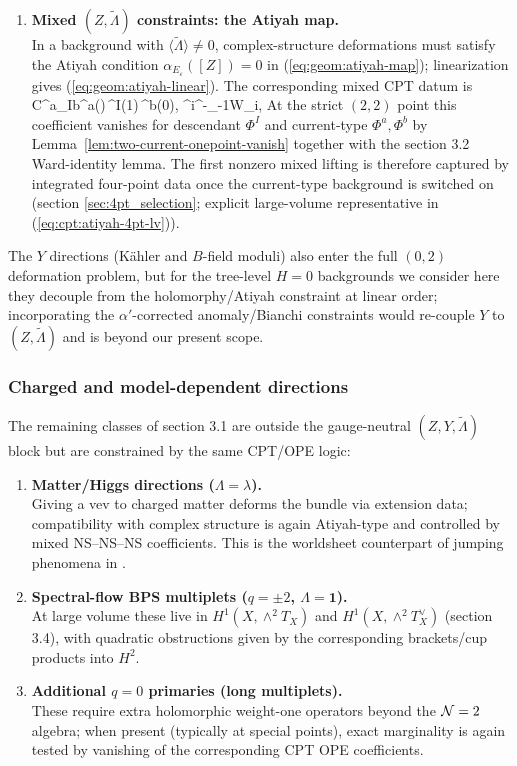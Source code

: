 \documentclass[12pt]{article}
\newcommand{\wt}[1]{\widetilde{#1}}
\begin{document}
\begin{enumerate}
\item {\bf Mixed $(Z,\widetilde\Lambda)$ constraints: the Atiyah map.}\\
In a background with $\langle\widetilde\Lambda\rangle\neq 0$, complex-structure deformations must satisfy the Atiyah condition $\alpha_{E_\varepsilon}([Z])=0$ in (\ref{eq:geom:atiyah-map}); linearization gives (\ref{eq:geom:atiyah-linear}). The corresponding mixed CPT datum is
\ie\label{eq:cpt:atiyah-3pt}
C^{a}{}_{Ib}\;\propto\;\left\langle \Phi^{a}(\infty)\,\Phi^{I}(1)\,\Phi^{b}(0)\right\rangle,
\qquad
\Phi^{i}\equiv \wt G^-_{-{1}}{\cal W}_i,
\fe
At the strict $(2,2)$ point this coefficient vanishes for descendant $\Phi^{I}$ and current-type $\Phi^{a},\Phi^{b}$ by Lemma~\ref{lem:two-current-onepoint-vanish} together with the section 3.2 Ward-identity lemma. The first nonzero mixed lifting is therefore captured by integrated four-point data once the current-type background is switched on (section \ref{sec:4pt_selection}; explicit large-volume representative in (\ref{eq:cpt:atiyah-4pt-lv})).
\end{enumerate}

The $Y$ directions (K\"ahler and $B$-field moduli) also enter the full $(0,2)$ deformation problem, but for the tree-level $H=0$ backgrounds we consider here they decouple from the holomorphy/Atiyah constraint at linear order; incorporating the $\alpha'$-corrected anomaly/Bianchi constraints would re-couple $Y$ to $(Z,\widetilde\Lambda)$ and is beyond our present scope.

\subsubsection*{Charged and model-dependent directions}

The remaining classes of section 3.1 are outside the gauge-neutral $(Z,Y,\widetilde\Lambda)$ block but are constrained by the same CPT/OPE logic:
\begin{enumerate}
\item {\bf Matter/Higgs directions ($\Lambda=\lambda$).}\\
Giving a vev to charged matter deforms the bundle via extension data; compatibility with complex structure is again Atiyah-type and controlled by mixed NS--NS--NS coefficients. This is the worldsheet counterpart of jumping phenomena in \cite{Anderson:2010mh,Anderson:2011ty}.
\item {\bf Spectral-flow BPS multiplets ($q=\pm 2$, $\Lambda=\mathbf{1}$).}\\
At large volume these live in $H^1(X,\wedge^2 T_X)$ and $H^1(X,\wedge^2 T_X^\vee)$ (section 3.4), with quadratic obstructions given by the corresponding brackets/cup products into $H^2$.
\item {\bf Additional $q=0$ primaries (long multiplets).}\\
These require extra holomorphic weight-one operators beyond the ${\cal N}=2$ algebra; when present (typically at special points), exact marginality is again tested by vanishing of the corresponding CPT OPE coefficients.
\end{enumerate}
\end{document}
